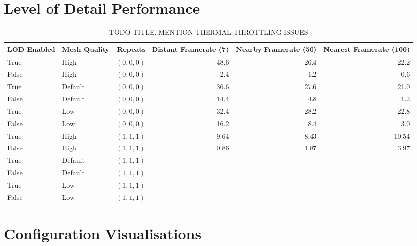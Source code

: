 \section{Level of Detail Performance}
\label{lod_analysis_section}
\begin{table}
  \begin{center}
  \begin{adjustbox}{width=\textwidth}
    \begin{tabular}{llrrrr}
    \hline
    \hline
    LOD Enabled & Mesh Quality & Repeats & Distant Framerate (7) & Nearby Framerate (50) & Nearest Framerate (100)\\
    \hline
    True & High & $(0,0,0)$ & 48.6 & 26.4 & 22.2 \\
    False & High & $(0,0,0)$ & 2.4 & 1.2 & 0.6 \\
    True & Default & $(0,0,0)$ & 36.6 & 27.6 & 21.0 \\
    False & Default & $(0,0,0)$ & 14.4 & 4.8 & 1.2 \\
    True & Low & $(0,0,0)$ & 32.4 & 28.2 & 22.8\\
    False & Low & $(0,0,0)$ & 16.2 & 8.4 & 3.0 \\
    \hline
    True & High & $(1,1,1)$ & 9.64 & 8.43 & 10.54 \\
    False & High & $(1,1,1)$ & 0.86 & 1.87 & 3.97 \\
    True & Default & $(1,1,1)$ & & & \\
    False & Default & $(1,1,1)$ & & & \\
    True & Low & $(1,1,1)$ & & &\\
    False & Low & $(1,1,1)$ & & & \\
    \hline
    \hline
    \end{tabular}
  \end{adjustbox}
  \end{center}
  \caption{TODO TITLE. MENTION THERMAL THROTTLING ISSUES}
  \label{tab:lod_test}
\end{table}

\section{Configuration Visualisations}
